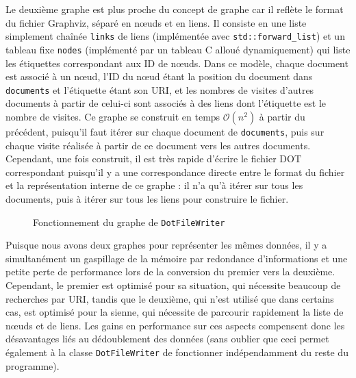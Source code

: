 \documentclass[11pt,a4paper]{article}
\begin{document}
Le deuxième graphe est plus proche du concept de graphe car il reflète le format du fichier Graphviz, séparé en nœuds et en liens. Il consiste en une liste simplement chaînée \texttt{links} de liens (implémentée avec \texttt{std::forward\_list}) et un tableau fixe \texttt{nodes} (implémenté par un tableau C alloué dynamiquement) qui liste les étiquettes correspondant aux ID de nœuds. Dans ce modèle, chaque document est associé à un nœud, l'ID du nœud étant la position du document dans \texttt{documents} et l'étiquette étant son URI, et les nombres de visites d'autres documents à partir de celui-ci sont associés à des liens dont l'étiquette est le nombre de visites. Ce graphe se construit en temps $ \mathcal{O}(n^2) $ à partir du précédent, puisqu'il faut itérer sur chaque document de \texttt{documents}, puis sur chaque visite réalisée à partir de ce document vers les autres documents. Cependant, une fois construit, il est très rapide d'écrire le fichier DOT correspondant puisqu'il y a une correspondance directe entre le format du fichier et la représentation interne de ce graphe : il n'a qu'à itérer sur tous les documents, puis à itérer sur tous les liens pour construire le fichier.

\begin{figure}[ht]	
	\centering
    \caption{Fonctionnement du graphe de \texttt{DotFileWriter}}
    \label{fig:dfw_graph}
\end{figure}

Puisque nous avons deux graphes pour représenter les mêmes données, il y a simultanément un gaspillage de la mémoire par redondance d'informations et une petite perte de performance lors de la conversion du premier vers la deuxième. Cependant, le premier est optimisé pour sa situation, qui nécessite beaucoup de recherches par URI, tandis que le deuxième, qui n'est utilisé que dans certains cas, est optimisé pour la sienne, qui nécessite de parcourir rapidement la liste de nœuds et de liens. Les gains en performance sur ces aspects compensent donc les désavantages liés au dédoublement des données (sans oublier que ceci permet également à la classe \texttt{DotFileWriter} de fonctionner indépendamment du reste du programme).
\end{document}
